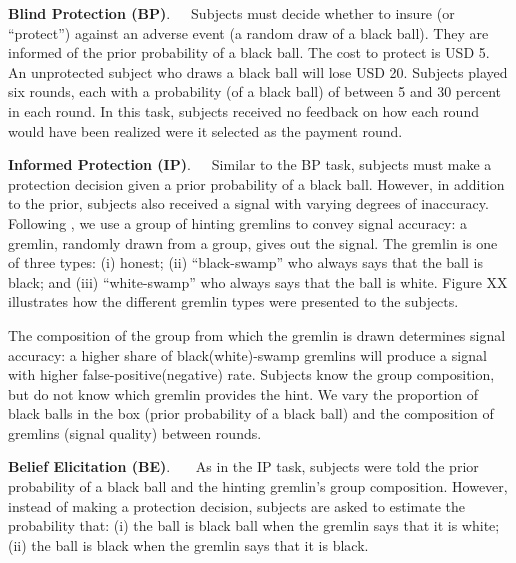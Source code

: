 \documentclass[12pt,a4paper]{article}
\begin{document}
\bigskip
\noindent\textbf{Blind Protection (BP)}.\ \ \ Subjects must decide whether to insure (or “protect”) against an adverse event (a random draw of a black ball).  They are informed of the prior probability of a black ball. The cost to protect is USD 5. An unprotected subject who draws a black ball will lose USD 20. Subjects played six rounds, each with a probability (of a black ball) of between 5 and 30 percent in each round. In this task, subjects received no feedback on how each round would have been realized were it selected as the payment round.

\bigskip
\noindent\textbf{Informed Protection (IP)}.\ \ \ Similar to the BP task, subjects must make a protection decision given a prior probability of a black ball. However, in addition to the prior, subjects also received a signal with varying degrees of inaccuracy. Following \citet{coutts_good_2019}, we use a group of hinting gremlins to convey signal accuracy: a gremlin, randomly drawn from a group, gives out the signal. The gremlin is one of three types: (i) honest; (ii) ``black-swamp'' who always says that the ball is black; and (iii) ``white-swamp'' who always says that the ball is white. Figure XX illustrates how the different gremlin types were presented to the subjects. 

The composition of the group from which the gremlin is drawn determines signal accuracy: a higher share of black(white)-swamp gremlins will produce a signal with higher false-positive(negative) rate. Subjects know the group composition, but do not know which gremlin provides the hint. We vary the proportion of black balls in the box (prior probability of a black ball) and the composition of gremlins (signal quality) between rounds.  

\bigskip
\noindent\textbf{Belief Elicitation (BE)}.\ \ \ 
As in the IP task, subjects were told the prior probability of a black ball and the hinting gremlin's group composition. However, instead of making a protection decision, subjects are asked to estimate the probability that: (i) the ball is black ball when the gremlin says that it is white; (ii) the ball is black when the gremlin says that it is black. 
\end{document}
